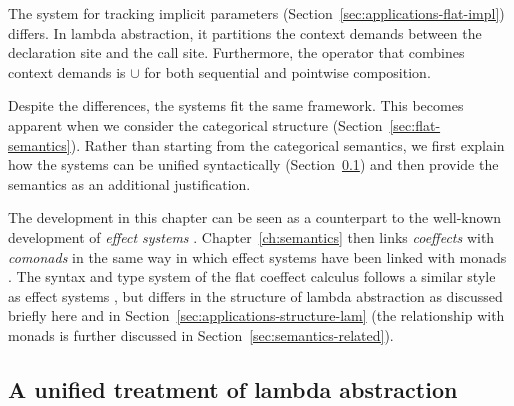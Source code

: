 The system for tracking implicit parameters (Section~\ref{sec:applications-flat-impl})
differs. In lambda abstraction, it partitions the context demands between the
declaration site and the call site. Furthermore, the operator that combines context demands
is $\cup$ for both sequential and pointwise composition.

Despite the differences, the systems fit the same framework. This becomes apparent when
we consider the categorical structure (Section~\ref{sec:flat-semantics}). Rather than starting
from the categorical semantics, we first explain how the systems can be unified syntactically
(Section~\ref{sec:flat-calculus-lambda}) and then provide the semantics as an additional
justification.

The development in this chapter can be seen as a counterpart to the well-known development of
\emph{effect systems} \cite{effects-gifford}. Chapter~\ref{ch:semantics} then links \emph{coeffects}
with \emph{comonads} in the same way in which effect systems have been linked with monads
\cite{monad-notions}. The syntax and type system of the flat coeffect calculus follows
a similar style as effect systems \cite{effects-polymorphic,effects-talpin-et-al}, but differs
in the structure of lambda abstraction as discussed briefly here and in Section~\ref{sec:applications-structure-lam}
(the relationship with monads is further discussed in Section~\ref{sec:semantics-related}).



\subsection{A unified treatment of lambda abstraction}
\label{sec:flat-calculus-lambda}

